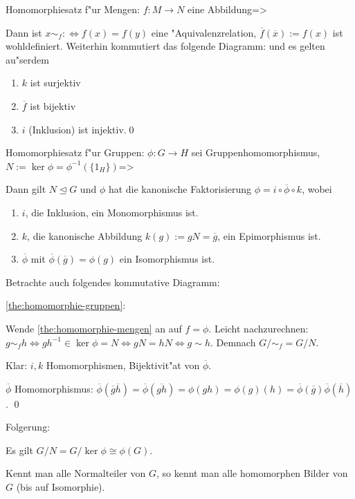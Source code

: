 \theorem Homomorphiesatz f"ur Mengen:
  $f:M\to N$ eine Abbildung=>{
  \label{the:homomorphie-mengen}
  Dann ist $x \sim_f:\iff f(x)=f(y)$ eine "Aquivalenzrelation,
  $\overline f(\overline x):=f(x)$ ist wohldefiniert. Weiterhin kommutiert
  das folgende Diagramm:
  und es gelten au"serdem
  \begin{enumerate}
    \item $k$ ist surjektiv
    \item $\overline f$ ist bijektiv
    \item $i$ (Inklusion) ist injektiv.\qed
    \end{enumerate}
  }
\theorem Homomorphiesatz f"ur Gruppen:
  $\phi :G\to H$ sei Gruppenhomomorphismus, $N:=\ker\phi=\phi^{-1}(\{1_H\})$=>{
  \label{the:homomorphie-gruppen}
  Dann gilt $N\unlhd G$ und $\phi$ hat die kanonische Faktorisierung
  $\phi=i\circ \overline \phi\circ k$, wobei
  \begin{enumerate}
    \item $i$, die Inklusion, ein Monomorphismus ist.
    \item $k$, die kanonische Abbildung $k(g):=gN=\overline g$, ein
      Epimorphismus ist.
    \item $\overline\phi$ mit $\overline \phi(\overline g)=\phi(g)$ ein
      Isomorphismus ist.
    \end{enumerate}
  Betrachte auch folgendes kommutative Diagramm:
  }
\proof \ref{the:homomorphie-gruppen}:{
  Wende \ref{the:homomorphie-mengen} an auf $f=\phi$. 
  Leicht nachzurechnen: $g\sim_f h\iff gh^{-1}\in \ker\phi=N\iff gN=hN\iff g\sim h$. 
  Demnach $G/ \sim_f = G/N$. 
  
  Klar: $i,k$ Homomorphismen, Bijektivit"at von $\overline \phi$.
  
  $\overline \phi$ Homomorphismus: 
  $\overline\phi(\overline g\overline h)
    =\overline\phi(\overline{gh})
    =\phi(gh)
    =\phi(g)(h)
    =\overline\phi(\overline g)\overline\phi(\overline h)$.
  \qed
  }
\remark Folgerung:{
  Es gilt $G/N=G/ \ker\phi \cong \phi(G)$.
  
  Kennt man alle Normalteiler von $G$, so kennt man alle homomorphen
  Bilder von $G$ (bis auf Isomorphie).
  }
